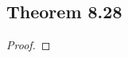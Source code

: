 \documentclass[../../main.tex]{subfiles}
\begin{document}
\subsection{Theorem 8.28}
\begin{wts}

\end{wts}
\begin{proof}

\end{proof}
\end{document}
